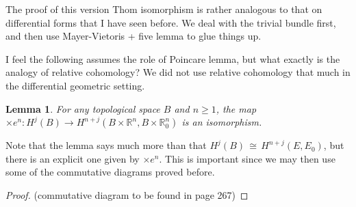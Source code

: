 \documentclass[12pt]{article}
\theoremstyle{plain}
\newtheorem{lemma}[equation]{Lemma}
\theoremstyle{definition}
\newcommand{\IR}{\mathbb{R}}
\newcommand\iso{\,{\cong}\,}
\newcommand{\<}{\langle}
\renewcommand{\>}{\rangle}
\begin{document}
The proof of this version Thom isomorphism is rather analogous to that on differential forms that I have seen before. We deal with the trivial bundle first, and then use Mayer-Vietoris + five lemma to glue things up.  

I feel the following assumes the role of Poincare lemma, but what exactly is the analogy of relative cohomology? We did not use relative cohomology that much in the differential geometric setting. 
\begin{lemma}
For any topological space $B$ and $n \ge 1$, the map $\times e^n : H^j(B) \to H^{n + j}(B \times \IR^n, B \times \IR^n_0)$ is an isomorphism. 
\end{lemma}
Note that the lemma says much more than that $H^j(B) \iso H^{n + j}(E, E_0)$, but there is an explicit one given by $\times e^n$. This is important since we may then use some of the commutative diagrams proved before. 
\begin{proof}
(commutative diagram to be found in page 267)
\end{proof}
\end{document}
